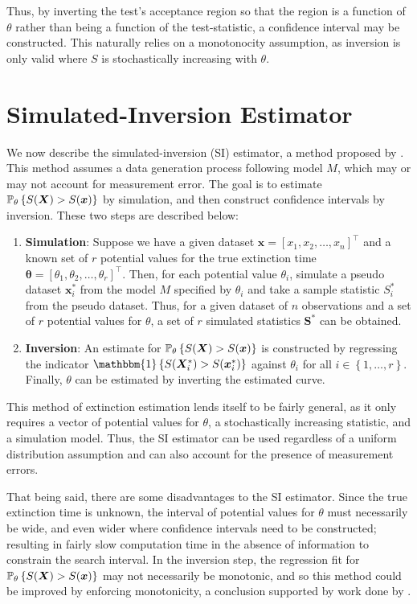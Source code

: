 Thus, by inverting the test's acceptance region so that the region is a function of $\theta$ rather than being a function of the test-statistic, a confidence interval may be constructed. This naturally relies on a monotonocity assumption, as inversion is only valid where $S$ is stochastically increasing with $\theta$.

\section{Simulated-Inversion Estimator}

We now describe the simulated-inversion (SI) estimator, a method proposed by \textcite{Huang2019}. This method assumes a data generation process following model $M$, which may or may not account for measurement error. The goal is to estimate $\mathbb{P}_\theta\left\{S(\bm{X}) > S(\bm{x})\right\}$ by simulation, and then construct confidence intervals by inversion. These two steps are described below:

\begin{enumerate}
    \item \textbf{Simulation}: Suppose we have a given dataset $\bm{x} = [x_1, x_2, \dots, x_n]^\top$ and a known set of $r$ potential values for the true extinction time $\bm{\theta} = [\theta_1, \theta_2, \dots, \theta_r]^\top$. Then, for each potential value $\theta_i$, simulate a pseudo dataset $\bm{x}^*_i$ from the model $M$ specified by $\theta_i$ and take a sample statistic $S^*_i$ from the pseudo dataset. Thus, for a given dataset of $n$ observations and a set of $r$ potential values for $\theta$, a set of $r$ simulated statistics $\bm{S}^*$ can be obtained.
    \item \textbf{Inversion}: An estimate for $\mathbb{P}_\theta\left\{S(\bm{X}) > S(\bm{x})\right\}$ is constructed by regressing the indicator $\mathbbm{1}\left\{ S(\bm{X}^*_i) > S(\bm{x}^*_i) \right\}$ against $\theta_i$ for all $i \in \left\{ 1, \dots, r \right\}$. Finally, $\theta$ can be estimated by inverting the estimated curve.
\end{enumerate}

This method of extinction estimation lends itself to be fairly general, as it only requires a vector of potential values for $\theta$, a stochastically increasing statistic, and a simulation model. Thus, the SI estimator can be used regardless of a uniform distribution assumption and can also account for the presence of measurement errors.

That being said, there are some disadvantages to the SI estimator. Since the true extinction time is unknown, the interval of potential values for $\theta$ must necessarily be wide, and even wider where confidence intervals need to be constructed; resulting in fairly slow computation time in the absence of information to constrain the search interval. In the inversion step, the regression fit for $\mathbb{P}_\theta\left\{S(\bm{X}) > S(\bm{x})\right\}$ may not necessarily be monotonic, and so this method could be improved by enforcing monotonicity, a conclusion supported by work done by \textcite{King2020}.

